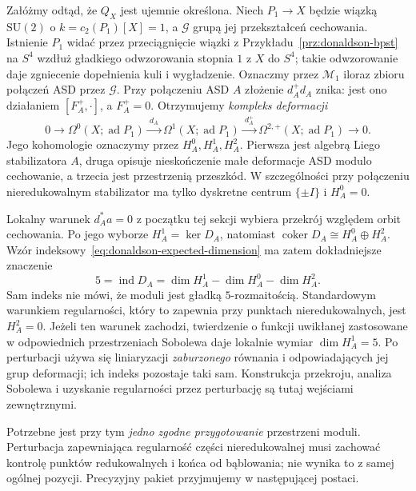 Załóżmy odtąd, że $Q_X$ jest ujemnie określona.
Niech $P_1\to X$ będzie wiązką $\mathrm{SU}(2)$
o $k=c_2(P_1)[X]=1$, a $\mathcal G$ grupą jej
przekształceń cechowania. Istnienie $P_1$ widać przez
przeciągnięcie wiązki z Przykładu~\ref{prz:donaldson-bpst}
na $S^4$ wzdłuż gładkiego odwzorowania stopnia $1$ z $X$ do $S^4$;
takie odwzorowanie daje zgniecenie dopełnienia kuli i wygładzenie.
Oznaczmy przez
$\mathcal M_1$ iloraz zbioru połączeń ASD przez
$\mathcal G$. Przy połączeniu ASD $A$ złożenie
$d_A^+d_A$ znika: jest ono działaniem
$[F_A^+,\cdot]$, a $F_A^+=0$. Otrzymujemy
\emph{kompleks deformacji}
\[
 0\longrightarrow
 \Omega^0(X;\operatorname{ad}P_1)
 \xrightarrow{\ d_A\ }
 \Omega^1(X;\operatorname{ad}P_1)
 \xrightarrow{\ d_A^+\ }
 \Omega^{2,+}(X;\operatorname{ad}P_1)
 \longrightarrow0.
\]
Jego kohomologie oznaczymy przez $H_A^0,H_A^1,H_A^2$.
Pierwsza jest algebrą Liego stabilizatora $A$,
druga opisuje nieskończenie małe deformacje ASD modulo
cechowanie, a trzecia jest przestrzenią przeszkód.
W szczególności przy połączeniu nieredukowalnym
stabilizator ma tylko dyskretne centrum
$\{\pm I\}$ i $H_A^0=0$.

Lokalny warunek $d_A^*a=0$ z początku tej sekcji
wybiera przekrój względem orbit cechowania.
Po jego wyborze $H_A^1=\ker D_A$, natomiast
$\operatorname{coker}D_A\cong H_A^0\oplus H_A^2$.
Wzór indeksowy~\eqref{eq:donaldson-expected-dimension}
ma zatem dokładniejsze znaczenie
\[
 5=\operatorname{ind}D_A
  =\dim H_A^1-\dim H_A^0-\dim H_A^2.
\]
Sam indeks nie mówi, że moduli jest gładką
$5$-rozmaitością. Standardowym warunkiem
regularności, który to zapewnia przy punktach
nieredukowalnych, jest $H_A^2=0$.
Jeżeli ten warunek zachodzi, twierdzenie o funkcji
uwikłanej zastosowane w odpowiednich przestrzeniach
Sobolewa daje lokalnie wymiar $\dim H_A^1=5$.
Po perturbacji używa się liniaryzacji \emph{zaburzonego}
równania i odpowiadających jej grup deformacji;
ich indeks pozostaje taki sam. Konstrukcja przekroju,
analiza Sobolewa i uzyskanie regularności przez
perturbację są tutaj wejściami zewnętrznymi.

Potrzebne jest przy tym \emph{jedno zgodne przygotowanie}
przestrzeni moduli. Perturbacja zapewniająca
regularność części nieredukowalnej musi zachować
kontrolę punktów redukowalnych i końca od bąblowania;
nie wynika to z samej ogólnej pozycji. Precyzyjny
pakiet przyjmujemy w następującej postaci.

